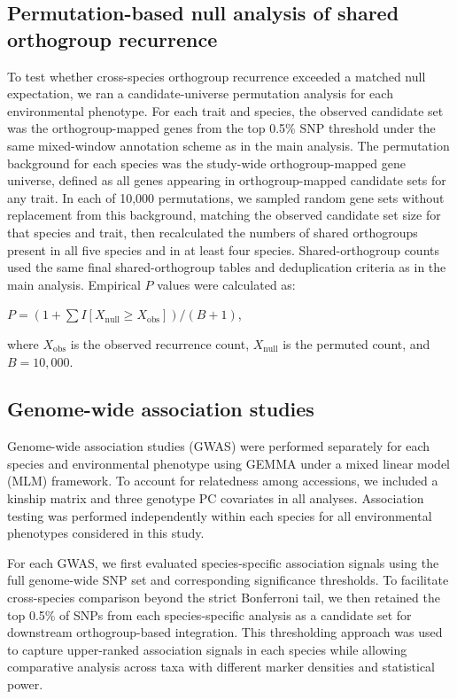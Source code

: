 \documentclass[unnumsec,webpdf,contemporary,large]{oup-authoring-template}%
\theoremstyle{thmstyleone}%
\theoremstyle{thmstyletwo}%
\theoremstyle{thmstylethree}%
\begin{document}
\subsection{Permutation-based null analysis of shared orthogroup recurrence}

To test whether cross-species orthogroup recurrence exceeded a matched null expectation, we ran a candidate-universe permutation analysis for each environmental phenotype. For each trait and species, the observed candidate set was the orthogroup-mapped genes from the top 0.5\% SNP threshold under the same mixed-window annotation scheme as in the main analysis. The permutation background for each species was the study-wide orthogroup-mapped gene universe, defined as all genes appearing in orthogroup-mapped candidate sets for any trait. In each of 10,000 permutations, we sampled random gene sets without replacement from this background, matching the observed candidate set size for that species and trait, then recalculated the numbers of shared orthogroups present in all five species and in at least four species. Shared-orthogroup counts used the same final shared-orthogroup tables and deduplication criteria as in the main analysis. Empirical $P$ values were calculated as:

$P = (1 + \sum I[X_{\mathrm{null}} \geq X_{\mathrm{obs}}])/(B+1)$, 

where $X_{\mathrm{obs}}$ is the observed recurrence count, $X_{\mathrm{null}}$ is the permuted count, and $B=10{,}000$.


\subsection{Genome-wide association studies}

Genome-wide association studies (GWAS) were performed separately for each species and environmental phenotype using GEMMA under a mixed linear model (MLM) framework. To account for relatedness among accessions, we included a kinship matrix and three genotype PC covariates in all analyses.  Association testing was performed independently within each species for all environmental phenotypes considered in this study.

For each GWAS, we first evaluated species-specific association signals using the full genome-wide SNP set and corresponding significance thresholds. To facilitate cross-species comparison beyond the strict Bonferroni tail, we then retained the top 0.5\% of SNPs from each species-specific analysis as a candidate set for downstream orthogroup-based integration. This thresholding approach was used to capture upper-ranked association signals in each species while allowing comparative analysis across taxa with different marker densities and statistical power.
\end{document}
